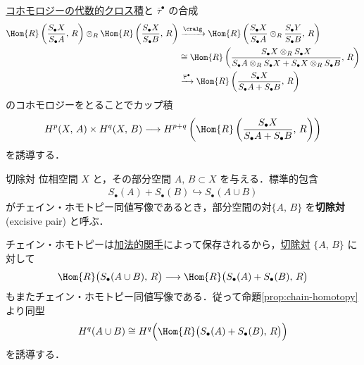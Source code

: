 \documentclass[algtopo_main]{subfiles}
\begin{document}
\hyperref[def:algcr-cohomology]{コホモロジーの代数的クロス積}と $\overline{\tau}^\bullet$ の合成
\begin{align}
    \Hom{R} \left( \frac{S_\bullet X}{S_\bullet A},\, R \right) \otimes_R \Hom{R} \left( \frac{S_\bullet X}{S_\bullet B},\, R \right) &\xrightarrow{\cralg} \Hom{R} \left( \frac{S_\bullet X}{S_\bullet A} \otimes_R \frac{S_\bullet Y}{S_\bullet B},\, R \right) \\ 
    &\cong \Hom{R} \left( \frac{S_\bullet X \otimes_R S_\bullet X}{S_\bullet A \otimes_R S_\bullet X + S_\bullet X \otimes_R S_\bullet B},\, R \right) \\
    &\xrightarrow{\overline{\tau}^\bullet} \Hom{R} \left( \frac{S_\bullet X}{S_\bullet A + S_\bullet B},\, R \right) 
\end{align}
のコホモロジーをとることでカップ積
\begin{align}
    \label{eq:rel-cup}
    H^p (X,\, A) \times H^q(X,\, B) \lto H^{p+q} \left( \Hom{R} \left( \frac{S_\bullet X}{S_\bullet A + S_\bullet B},\, R \right)   \right)
\end{align}
を誘導する．

\begin{mydef}[label=def:exc-pair]{切除対}
    位相空間 $X$ と，その部分空間 $A,\, B \subset X$ を与える．標準的包含
    \begin{align}
        S_\bullet (A) + S_\bullet (B) \hookrightarrow S_\bullet (A \cup B)
    \end{align}
    がチェイン・ホモトピー同値写像であるとき，部分空間の対$\{A,\, B\}$ を\textbf{切除対} (excisive pair) と呼ぶ．
\end{mydef}

チェイン・ホモトピーは\hyperref[def:Ab-func]{加法的関手}によって保存されるから，\hyperref[def:exc-pair]{切除対} $\{A,\, B\}$ に対して
\begin{align}
    \Hom{R} \bigl( S_\bullet (A \cup B),\, R \bigr) \lto \Hom{R} \bigl( S_\bullet (A) + S_\bullet (B),\, R \bigr) 
\end{align}
もまたチェイン・ホモトピー同値写像である．従って命題\ref{prop:chain-homotopy}より同型
\begin{align}
    \label{isom:relative-cup}
    H^q (A \cup B) \cong H^q \Bigl( \Hom{R} \bigl( S_\bullet (A) + S_\bullet (B),\, R \bigr)  \Bigr) 
\end{align}
を誘導する．
\end{document}
